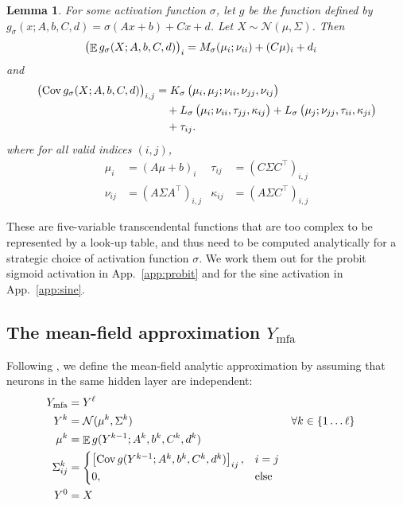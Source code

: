 \documentclass{article}
\newtheorem{lemma}{Lemma}
\DeclareMathOperator{\expect}{\mathbb{E}}
\DeclareMathOperator{\Cov}{\operatorname{Cov}}
\begin{document}
\begin{lemma}
\label{lem:moment-maps}
  For some activation function \(\sigma\), let \(g\) be the function defined by \(g_\sigma(x; A, b, C, d) = \sigma(A
  x+ b) + C x + d\).
  Let \(X \sim \mathcal N(\mu, \Sigma)\).
  Then
  \begin{align*}
    \del{\expect g_\sigma(X; A, b, C, d)}_i &= M_\sigma(\mu_i; \nu_{ii}) +
    (C\mu)_i + d_i
  \end{align*}
  and
  \begin{align*}
    \begin{split}
      \del{\Cov g_\sigma(X; A, b, C, d)}_{i, j} &=
        K_\sigma\del{
          \mu_i, \mu_j; \nu_{ii}, \nu_{jj}, \nu_{ij}
        } \\
        &\quad + L_\sigma\del{
          \mu_i; \nu_{ii}, \tau_{jj},\kappa_{ij}
        }
        + L_\sigma\del{
          \mu_j; \nu_{jj}, \tau_{ii},\kappa_{ji}
        } \\
        &\quad + \tau_{ij}.
    \end{split}
  \end{align*}
  where for all valid indices \((i, j)\),
  \begin{align*}
    \mu_i &= (A\mu + b)_i
    &
    \tau_{ij}
    &= (C\Sigma C^\intercal)_{i,j}
    \\
    \nu_{ij} &= (A\Sigma A^\intercal)_{i,j}
    &
    \kappa_{ij}
    &= (A \Sigma C^\intercal)_{i,j}
  \end{align*}
\end{lemma}
These are five-variable transcendental functions that are too complex to be represented by a look-up table, and thus need to be computed analytically for a strategic choice of activation function \(\sigma\).
We work them out for the probit sigmoid activation in App.~\ref{app:probit} and for the sine activation in App.~\ref{app:sine}.

\subsection{The mean-field approximation \(Y_\mathrm{mfa}\)}
Following \citet{huber_bayesian_2020, wagner_kalman_2022,akgul_deterministic_2025}, we define the mean-field analytic approximation by assuming that neurons in the same hidden layer are independent:
\begin{align*}
  Y_\mathrm{mfa} &=  Y^\ell\\
  Y^k &= \mathcal N(\mu^k, \Sigma^k) & \forall k &\in \cbr{1 \ldots \ell} \\
  \mu^k &= \expect g(Y^{k-1}; A^k, b^k, C^k, d^k)
  \\
  \Sigma^k_{ij} &= \begin{cases}
    \sbr{\Cov g(Y^{k-1}; A^k, b^k, C^k, d^k)}_{ij}, & i=j
    \\
    0, &\text{else}
  \end{cases}
  \\
  Y^0 &= X
\end{align*}
\end{document}
